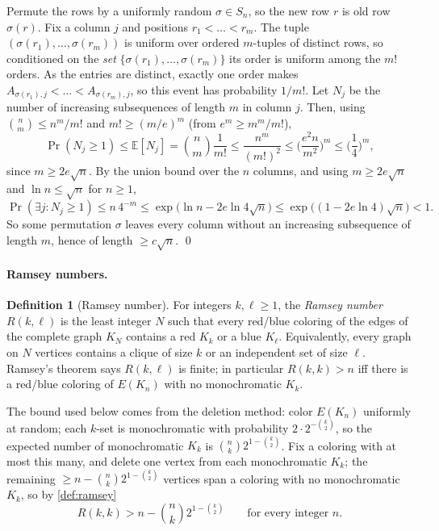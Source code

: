 \documentclass[a4paper,12pt]{article}
\newcommand{\mb}[1]{\mathbb{#1}}
\theoremstyle{definition}
\newtheorem{definition}{Definition}
\theoremstyle{plain}
\begin{document}
Permute the rows by a uniformly random $\sigma \in S_n$, so the new row $r$ is old row $\sigma(r)$. Fix a column $j$ and positions $r_1 < \dots < r_m$. The tuple $(\sigma(r_1), \dots, \sigma(r_m))$ is uniform over ordered $m$-tuples of distinct rows, so conditioned on the \emph{set} $\{\sigma(r_1), \dots, \sigma(r_m)\}$ its order is uniform among the $m!$ orders. As the entries are distinct, exactly one order makes $A_{\sigma(r_1), j} < \dots < A_{\sigma(r_m), j}$, so this event has probability $1/m!$. Let $N_j$ be the number of increasing subsequences of length $m$ in column $j$. Then, using $\binom nm \le n^m / m!$ and $m! \ge (m/e)^m$ (from $e^m \ge m^m/m!$),
\[
	\Pr(N_j \ge 1) \le \mb E[N_j] = \binom nm \frac{1}{m!} \le \frac{n^m}{(m!)^2} \le \Big( \frac{e^2 n}{m^2} \Big)^m \le \Big( \frac14 \Big)^m,
\]
since $m \ge 2e\sqrt n$. By the union bound over the $n$ columns, and using $m \ge 2e\sqrt n$ and $\ln n \le \sqrt n$ for $n \ge 1$,
\[
	\Pr(\exists j : N_j \ge 1) \le n \, 4^{-m} \le \exp\big( \ln n - 2e \ln 4 \sqrt n \big) \le \exp\big( (1 - 2e\ln 4) \sqrt n \big) < 1 .
\]
So some permutation $\sigma$ leaves every column without an increasing subsequence of length $m$, hence of length $\ge c\sqrt n$. \qed

\paragraph{Ramsey numbers.}

\begin{definition}[Ramsey number]\label{def:ramsey}
	For integers $k, \ell \ge 1$, the \emph{Ramsey number} $R(k,\ell)$ is the least integer $N$ such that every red/blue coloring of the edges of the complete graph $K_N$ contains a red $K_k$ or a blue $K_\ell$. Equivalently, every graph on $N$ vertices contains a clique of size $k$ or an independent set of size $\ell$. Ramsey's theorem says $R(k, \ell)$ is finite; in particular $R(k,k) > n$ iff there is a red/blue coloring of $E(K_n)$ with no monochromatic $K_k$.
\end{definition}

The bound used below comes from the deletion method: color $E(K_n)$ uniformly at random; each $k$-set is monochromatic with probability $2 \cdot 2^{-\binom k2}$, so the expected number of monochromatic $K_k$ is $\binom nk 2^{1 - \binom k2}$. Fix a coloring with at most this many, and delete one vertex from each monochromatic $K_k$; the remaining $\ge n - \binom nk 2^{1-\binom k2}$ vertices span a coloring with no monochromatic $K_k$, so by \autoref{def:ramsey}
\begin{equation}\label{eq:deletion}
	R(k,k) > n - \binom nk 2^{1 - \binom k2} \qquad \text{for every integer } n.
\end{equation}
\end{document}

